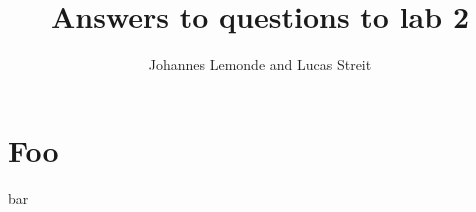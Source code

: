 \documentclass[a4paper,10pt]{article}
\title{Answers to questions to lab 2}
\author{Johannes Lemonde and Lucas Streit}
\begin{document}
\maketitle


\section{Foo}

bar
\end{document}

